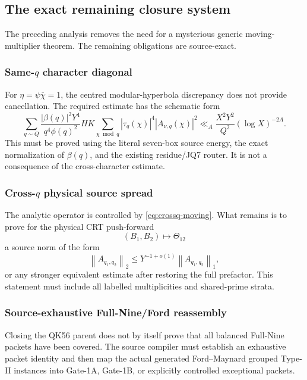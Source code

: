 \documentclass[11pt]{article}
\theoremstyle{definition}
\newcommand{\1}{\mathbf 1}
\newcommand{\norm}[1]{\left\lVert #1\right\rVert}
\begin{document}
\subsection{The exact remaining closure system}

The preceding analysis removes the need for a mysterious generic
moving-multiplier theorem.  The remaining obligations are source-exact.

\subsubsection{Same-\texorpdfstring{$q$}{q} character diagonal}

For $\eta=\psi\overline\chi=1$, the centred modular-hyperbola discrepancy
does not provide cancellation.  The required estimate has the schematic
form
\[
 \sum_{q\sim Q}
 \frac{|\beta(q)|^2Y^4}{q^4\phi(q)^2}
 HK
 \sum_{\chi\bmod q}
 |\tau_q(\chi)|^4|A_{\nu,q}(\chi)|^2
 \ll_A
 \frac{X^2Y^2}{Q^2}(\log X)^{-2A}.
\]
This must be proved using the literal seven-box source energy, the exact
normalization of $\beta(q)$, and the existing residue/JQ7 router.  It is not
a consequence of the cross-character estimate.

\subsubsection{Cross-\texorpdfstring{$q$}{q} physical source spread}

The analytic operator is controlled by \eqref{eq:crossq-moving}.  What
remains is to prove for the physical CRT push-forward
\[
 (B_1,B_2)\longmapsto \Theta_{12}
\]
a source norm of the form
\begin{equation}
  \boxed{
  \norm{A_{q_1,q_2}}_2
  \le
  Y^{-1+o(1)}
  \norm{A_{q_1,q_2}}_1,
  }
  \label{eq:source-spread}
\end{equation}
or any stronger equivalent estimate after restoring the full prefactor.
This statement must include all labelled multiplicities and shared-prime
strata.

\subsubsection{Source-exhaustive Full-Nine/Ford reassembly}

Closing the QK56 parent does not by itself prove that all balanced Full-Nine
packets have been covered.  The source compiler must establish an exhaustive
packet identity and then map the actual generated Ford--Maynard grouped
Type-II instances into Gate-1A, Gate-1B, or explicitly controlled
exceptional packets.
\end{document}
